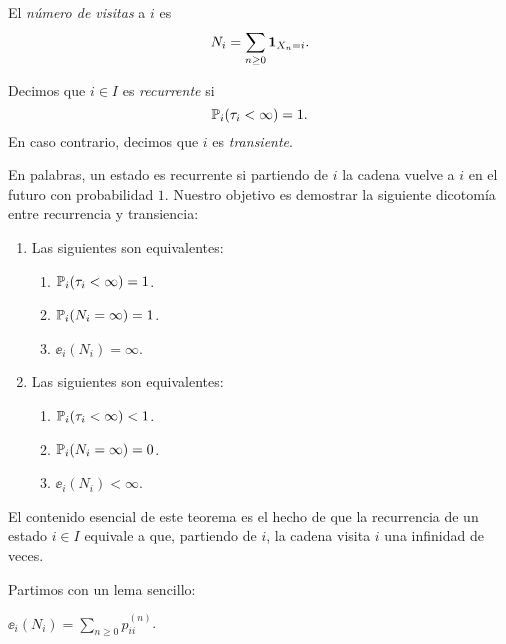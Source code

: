 \begin{defn}
El \emph{número de visitas} a $i$ es
\[N_i=\sum_{n\geq0}\mathbf{1}_{X_n=i}.\]
\end{defn}

\begin{defn}
Decimos que $i\in I$ es \emph{recurrente} si
\[\mathbb{P}_i(\tau_i<\infty)=1.\]
En caso contrario, decimos que $i$ es \emph{transiente}.
\end{defn}

En palabras, un estado es recurrente si partiendo de $i$ la cadena vuelve a $i$ en el futuro con probabilidad $1$.
Nuestro objetivo es demostrar la siguiente dicotomía entre recurrencia y transiencia:

\begin{thm}\label{thm:rec-trans}
\leavevmode
\begin{enumerate}[label=\uptext{\arabic*.}]
\item {}\enspace Las siguientes son equivalentes:
\begin{enumerate}[label=\uptext{(\roman*)}]
\item $\mathbb{P}_i(\tau_i<\infty)=1$.
\item $\mathbb{P}_i(N_i=\infty)=1$.
\item $\ee_i(N_i)=\infty$.
\end{enumerate}
\item {}\enspace Las siguientes son equivalentes:
\begin{enumerate}[label=\uptext{(\roman*)}]
\item $\mathbb{P}_i(\tau_i<\infty)<1$.
\item $\mathbb{P}_i(N_i=\infty)=0$.
\item $\ee_i(N_i)<\infty$.
\end{enumerate}
\end{enumerate}
\end{thm}

El contenido esencial de este teorema es el hecho de que la recurrencia de un estado $i\in I$ equivale a que, partiendo de $i$, la cadena visita $i$ una infinidad de veces.

Partimos con un lema sencillo:

\begin{lem}
$\ee_i(N_i)=\sum_{n\geq0}p_{ii}^{(n)}$.
\end{lem}

